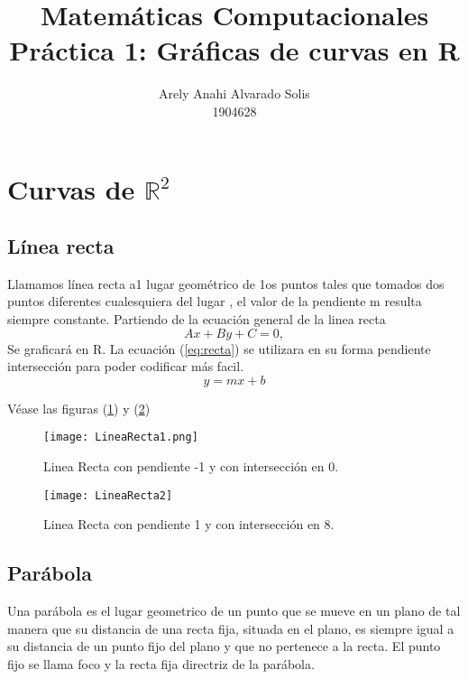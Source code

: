 \documentclass[12pt,a4paper]{article}
\title{Matemáticas Computacionales \\ Práctica 1: Gráficas de curvas en R}
\author{Arely Anahi Alvarado Solis \\ 1904628}
\date{}
\begin{document}
\maketitle

\section{Curvas de $\mathbb{R}^2$} \label{sec:curvas}

\subsection{Línea recta} \label{subsec:linearecta}
Llamamos línea recta a1 lugar geométrico de 1os puntos tales que tomados dos puntos diferentes cualesquiera del lugar , el valor de la pendiente m resulta siempre constante.
\citep{geometria}
Partiendo de la ecuación general de la linea recta
\begin{equation}
Ax + By + C = 0, \label{eq:recta}
\end{equation}
Se graficará en R. La ecuación (\ref{eq:recta}) se utilizara en su forma pendiente intersección para poder codificar más facil.
\begin{equation}
y = mx + b \label{eq:pendienteinterseccion}
\end{equation}

Véase las figuras (\ref{fig:recta-1}) y (\ref{fig:recta-2})


\begin{figure}
\centering
\texttt{[image: LineaRecta1.png]}
\caption{Linea Recta con pendiente -1 y con intersección en 0.}
\label{fig:recta-1}
\end{figure}

\begin{figure}
\centering
\texttt{[image: LineaRecta2]}
\caption{Linea Recta con pendiente 1 y con intersección en 8.}
\label{fig:recta-2}
\end{figure}



\newpage
\subsection{Parábola} \label{subsec:parabola}

Una parábola es el lugar geometrico de un punto que se mueve en un plano de tal manera que su distancia de una recta fija, situada en el plano, es siempre igual a su distancia de un punto fijo del plano y que no pertenece a la recta.
El punto fijo se llama foco y la recta fija directriz de la parábola.
\end{document}

